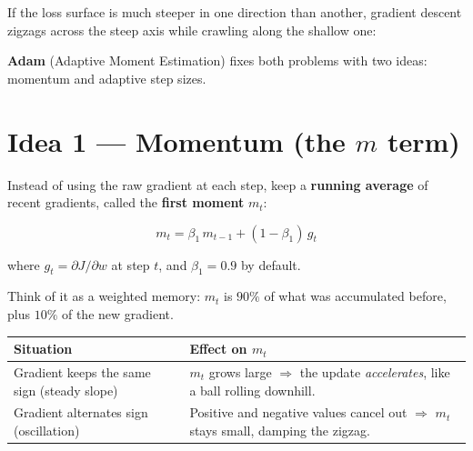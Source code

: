 \documentclass[12pt, a4paper]{article}
\theoremstyle{definition}
\begin{document}
If the loss surface is much steeper in one direction than another, gradient
descent zigzags across the steep axis while crawling along the shallow one:

\begin{center}
\end{center}

\textbf{Adam} (Adaptive Moment Estimation) fixes both problems with two ideas:
momentum and adaptive step sizes.

\section{Idea 1 — Momentum (the $m$ term)}

Instead of using the raw gradient at each step, keep a \textbf{running
  average} of recent gradients, called the \textbf{first moment} $m_t$:

\[
  m_t = \beta_1 \, m_{t-1} + (1 - \beta_1)\, g_t
\]

where $g_t = \partial J / \partial w$ at step $t$, and $\beta_1 = 0.9$ by
default.

Think of it as a weighted memory: $m_t$ is $90\%$ of what was accumulated
before, plus $10\%$ of the new gradient.

\begin{center}
  \renewcommand{\arraystretch}{1.3}
  \begin{tabular}{lp{9cm}}
    \toprule
    Situation                                   & Effect on $m_t$ \\
    \midrule
    Gradient keeps the same sign (steady slope) &
    $m_t$ grows large $\Rightarrow$ the update \emph{accelerates}, like a
    ball rolling downhill.                                        \\
    Gradient alternates sign (oscillation)      &
    Positive and negative values cancel out $\Rightarrow$ $m_t$ stays small,
    damping the zigzag.                                           \\
    \bottomrule
  \end{tabular}
\end{center}
\end{document}

